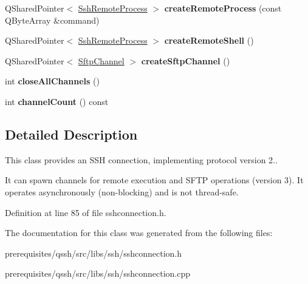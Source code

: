 \begin{DoxyCompactItemize}
Q\+Shared\+Pointer$<$ \mbox{\hyperlink{class_q_ssh_1_1_ssh_remote_process}{Ssh\+Remote\+Process}} $>$ {\bfseries create\+Remote\+Process} (const Q\+Byte\+Array \&command)
\item 
\mbox{\label{class_q_ssh_1_1_ssh_connection_a3e02b0b22b0bb03f332db98453becb82}} 
Q\+Shared\+Pointer$<$ \mbox{\hyperlink{class_q_ssh_1_1_ssh_remote_process}{Ssh\+Remote\+Process}} $>$ {\bfseries create\+Remote\+Shell} ()
\item 
\mbox{\label{class_q_ssh_1_1_ssh_connection_a5865f1828a0a97766677b77474e7a473}} 
Q\+Shared\+Pointer$<$ \mbox{\hyperlink{class_q_ssh_1_1_sftp_channel}{Sftp\+Channel}} $>$ {\bfseries create\+Sftp\+Channel} ()
\item 
\mbox{\label{class_q_ssh_1_1_ssh_connection_abc604a8d75f360cb14aa824599d894fd}} 
int {\bfseries close\+All\+Channels} ()
\item 
\mbox{\label{class_q_ssh_1_1_ssh_connection_ab2d8de539c3e91eba3a29b168f44df2b}} 
int {\bfseries channel\+Count} () const
\end{DoxyCompactItemize}


\subsection{Detailed Description}
This class provides an S\+SH connection, implementing protocol version 2.. 

It can spawn channels for remote execution and S\+F\+TP operations (version 3). It operates asynchronously (non-\/blocking) and is not thread-\/safe. 

Definition at line 85 of file sshconnection.\+h.



The documentation for this class was generated from the following files\+:\begin{DoxyCompactItemize}
\item 
prerequisites/qssh/src/libs/ssh/sshconnection.\+h\item 
prerequisites/qssh/src/libs/ssh/sshconnection.\+cpp\end{DoxyCompactItemize}
